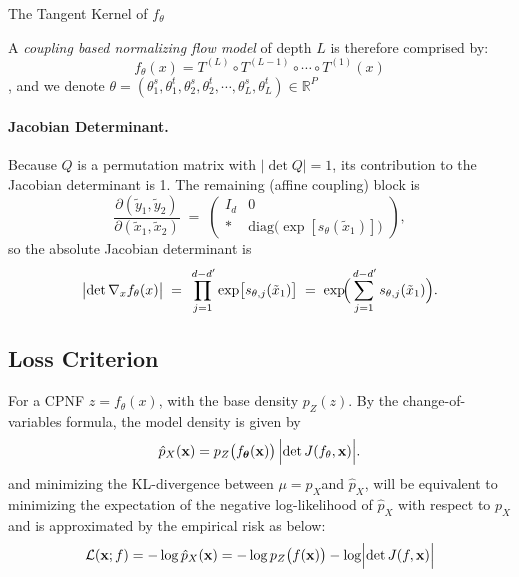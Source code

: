 \documentclass[11pt, a4paper]{article}
\theoremstyle{definition}
\theoremstyle{remark}
\newcommand{\R}{\mathbb{R}}
\begin{document}
	The Tangent Kernel of \(f_\theta\)
	
	A \textit{coupling based normalizing flow model} of depth \(L\) is therefore comprised by:
	\[
	f_\theta (x) = T^{(L)} \circ  T^{(L-1)} \circ \cdots \circ  T^{(1)} (x) 
	 \]
	 , and we denote \(\theta = (\theta_1^s , \theta_1^t, \theta_2^s , \theta_2^t , \cdots ,\theta_L^s , \theta_L^t) \in \R^P \)
	
	\paragraph{Jacobian Determinant.}
	Because $Q$ is a permutation matrix with $\lvert \det Q \rvert = 1$, its contribution to the Jacobian determinant is 1.
	The remaining (affine coupling) block is
	\[
	\frac{\partial (\tilde{y}_1, \tilde{y}_2)}{\partial (\tilde{x}_1, \tilde{x}_2)}
	\;=\;
	\begin{pmatrix}
		I_{d} & 0 \\
		* & \mathrm{diag}\!\bigl(\exp[s_\theta(\tilde{x}_1)]\bigr)
	\end{pmatrix},
	\]
	so the absolute Jacobian determinant is
	\[
	\bigl|\det \nabla_x f_\theta(x)\bigr|
	\;=\;
	\prod_{j=1}^{\,d-d'} \exp\bigl[s_{\theta,j}(\tilde{x}_1)\bigr]
	\;=\;
	\exp\!\Bigl(\sum_{j=1}^{\,d-d'} s_{\theta,j}(\tilde{x}_1)\Bigr).
	\]
	\subsection{Loss Criterion}
	For a CPNF \(z = f_{\theta}(x)\),
	with the base density \( p_Z(z) \). By the change-of-variables formula, the model density is given by
	\[
	\hat{p}_X(\mathbf{x}) = p_Z\bigl(f_{\boldsymbol{\theta}}(\mathbf{x})\bigr) \, \Bigl|\det J(f_\theta,\mathbf{x}) \Bigr|.
	\]
	and minimizing the KL-divergence between \(\mu=p_X\)and \(\hat{p}_X\), will be equivalent to minimizing the expectation of the negative log-likelihood of \(\hat{p}_X\) with respect to \(p_X\) and is approximated by the empirical risk as below:
	\[
	\mathcal{L}(\mathbf{x}; f) = -\log\hat{p}_X(\mathbf{x}) = -\log p_Z\bigl(f(\mathbf{x})\bigr) - \log \Bigl|\det J(f,\mathbf{x}) \Bigr|
	\]
\end{document}
